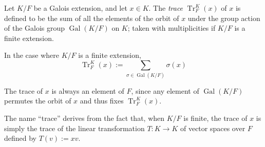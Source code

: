 \documentclass[12pt]{article}
\begin{document}
Let $K/F$ be a Galois extension, and let $x \in K$. The {\em trace} $\operatorname{Tr}_F^K(x)$ of $x$ is defined to be the sum of all the elements of the orbit of $x$ under the group action of the Galois group $\operatorname{Gal}(K/F)$ on $K$; taken with multiplicities if $K/F$ is a finite extension.

In the case where $K/F$ is a finite extension,
$$
\operatorname{Tr}_F^K(x) := \sum_{\sigma \in \operatorname{Gal}(K/F)} \sigma(x)
$$

The trace of $x$ is always an element of $F$, since any element of $\operatorname{Gal}(K/F)$ permutes the orbit of $x$ and thus fixes $\operatorname{Tr}_F^K(x)$.

The name ``trace'' derives from the fact that, when $K/F$ is finite, the trace of $x$ is simply the trace of the linear transformation $T: K \longrightarrow K$ of vector spaces over $F$ defined by $T(v) := xv$.
\end{document}
